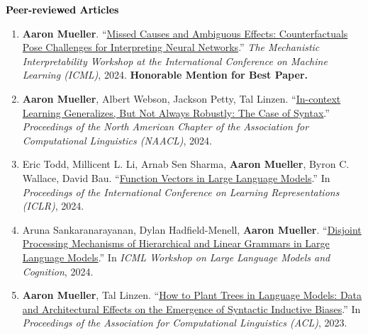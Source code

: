 \documentclass[10pt]{article}
\renewcommand{\section}[1]{\pagebreak[3]%
	\vspace{0.5\baselineskip}%
	\phantomsection\addcontentsline{toc}{section}{#1}%
	\noindent\llap{\bf\scshape\smash{\parbox[t]{\marginparwidth}{\hyphenpenalty=10000\raggedright \textcolor{black}{#1}}}}%
	\vspace{-\baselineskip}\par}
\renewcommand{\subsection}[1]{\textcolor{black}{#1}}
\providecommand*\titlelink[2]{\href{#1}{\textcolor{accent}{#2}}}
\begin{document}
	\section{Publications}

	\subsection{\textbf{Peer-reviewed Articles}}
	\begin{enumerate}[leftmargin=*, topsep=0pt, itemsep=0.25ex, partopsep=0ex, parsep=1ex]
	
	\item \textbf{Aaron Mueller}. ``\titlelink{https://arxiv.org/abs/2407.04690v1}{Missed Causes and Ambiguous Effects: Counterfactuals Pose Challenges for Interpreting Neural Networks}.'' \emph{The Mechanistic Interpretability Workshop at the International Conference on Machine Learning (ICML)}, 2024. \textbf{\textcolor{accent}{Honorable Mention for Best Paper.}}\label{pub:missed-causes}
	
	\item \textbf{Aaron Mueller}, Albert Webson, Jackson Petty, Tal Linzen. ``\titlelink{https://arxiv.org/abs/2311.07811}{In-context Learning Generalizes, But Not Always Robustly: The Case of Syntax}.'' \emph{Proceedings of the North American Chapter of the Association for Computational Linguistics (NAACL)}, 2024.\label{pub:icl-ood}
	
	\item Eric Todd, Millicent L. Li, Arnab Sen Sharma, \textbf{Aaron Mueller}, Byron C. Wallace, David Bau. ``\titlelink{https://arxiv.org/abs/2310.15213}{Function Vectors in Large Language Models}.'' In \emph{Proceedings of the International Conference on Learning Representations (ICLR)}, 2024.\label{pub:function-vectors}
	
	\item Aruna Sankaranarayanan, Dylan Hadfield-Menell, \textbf{Aaron Mueller}. ``\titlelink{https://openreview.net/forum?id=qg2TJ3eKOr}{Disjoint Processing Mechanisms of Hierarchical and Linear Grammars in Large Language Models}.'' In \emph{ICML Workshop on Large Language Models and Cognition}, 2024.
	
	\item \textbf{Aaron Mueller}, Tal Linzen. ``\titlelink{https://arxiv.org/abs/2305.19905}{How to Plant Trees in Language Models: Data and Architectural Effects on the Emergence of Syntactic Inductive Biases}.'' In \emph{Proceedings of the Association for Computational Linguistics (ACL)}, 2023.
		

\end{enumerate}
\end{document}
